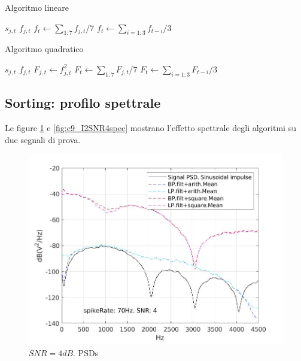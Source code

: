 \documentclass[9pt,twocolumn,twoside]{osajnl}
\begin{document}
\begin{algorithm}
\caption{Algoritmo lineare}\label{alg:arit}
\begin{algorithmic}[1]
\State $s_{j,t}$ 
\State $f_{j,t}$ 
\State $f_{t}\gets \sum_{1:7}   f_{j,t}/7$
\State $f_{t}\gets \sum_{i=1:3} f_{t-i}/3$
\end{algorithmic}
\end{algorithm}


\begin{algorithm}
\caption{Algoritmo quadratico}\label{alg:quad}
\begin{algorithmic}[1]
\State $s_{j,t}$ 
\State $f_{j,t}$ 
\State $F_{j,t}\gets f^{2}_{j,t}$
\State $F_{t}\gets \sum_{1:7}   F_{j,t}/7$
\State $F_{t}\gets \sum_{i=1:3} F_{t-i}/3$
\end{algorithmic}
\end{algorithm}





\subsection{Sorting: profilo spettrale}

Le figure \ref{fig:c9_I5SNR4spec} e \ref{fig:c9_I2SNR4spec} mostrano l'effetto spettrale degli algoritmi su due segnali di prova.



\begin{figure}[htbp]
\centering
\includegraphics[width=1\linewidth]{results/c9_I5SNR4spec.jpg}
\caption{$SNR = 4dB$. PSDs}
\label{fig:c9_I5SNR4spec}
\end{figure}
\end{document}
